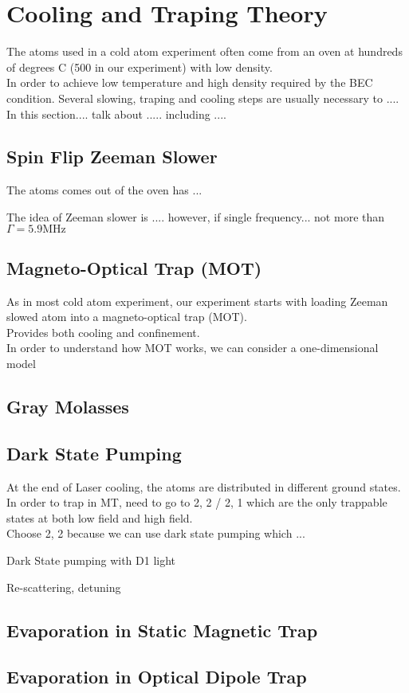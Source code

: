 
\section{Cooling and Traping Theory}
The atoms used in a cold atom experiment often come from an oven at hundreds of degrees C (500 in our experiment) with low density.\\
In order to achieve low temperature and high density required by the BEC condition. Several slowing, traping and cooling steps are usually necessary to ....\\
In this section.... talk about ..... including ....\\

\subsection{Spin Flip Zeeman Slower}

The atoms comes out of the oven has ...\\

The idea of Zeeman slower is .... however, if single frequency... not more than $\Gamma=5.9\text{MHz}$


\subsection{Magneto-Optical Trap (MOT)}

As in most cold atom experiment, our experiment starts with loading Zeeman slowed atom into a magneto-optical trap (MOT).\\
Provides both cooling and confinement.\\
In order to understand how MOT works, we can consider a one-dimensional model\\

\subsection{Gray Molasses}

\subsection{Dark State Pumping}
At the end of Laser cooling, the atoms are distributed in different ground states.\\
In order to trap in MT, need to go to 2, 2 / 2, 1 which are the only trappable states at both low field and high field.\\
Choose 2, 2 because we can use dark state pumping which ...

Dark State pumping with D1 light

Re-scattering, detuning

\subsection{Evaporation in Static Magnetic Trap}

\subsection{Evaporation in Optical Dipole Trap}

